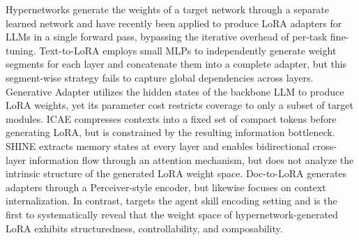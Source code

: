 Hypernetworks generate the weights of a target network through a separate learned network \citep{Ha2017Hypernetwork} and have recently been applied to produce LoRA adapters \citep{Hu2022LoRA} for LLMs in a single forward pass, bypassing the iterative overhead of per-task fine-tuning. Text-to-LoRA \citep{charakorn2025texttolorainstanttransformeradaption} employs small MLPs to independently generate weight segments for each layer and concatenate them into a complete adapter, but this segment-wise strategy fails to capture global dependencies across layers. Generative Adapter \citep{Chen2025GenAdapter} utilizes the hidden states of the backbone LLM to produce LoRA weights, yet its parameter cost restricts coverage to only a subset of target modules. ICAE \citep{ge2024incontextautoencodercontextcompression} compresses contexts into a fixed set of compact tokens before generating LoRA, but is constrained by the resulting information bottleneck. SHINE \citep{Liu2026SHINE} extracts memory states at every layer and enables bidirectional cross-layer information flow through an attention mechanism, but does not analyze the intrinsic structure of the generated LoRA weight space. Doc-to-LoRA \citep{charakorn2026doctoloralearninginstantlyinternalize} generates adapters through a Perceiver-style encoder, but likewise focuses on context internalization. In contrast, \method{} targets the agent skill encoding setting and is the first to systematically reveal that the weight space of hypernetwork-generated LoRA exhibits structuredness, controllability, and composability.
